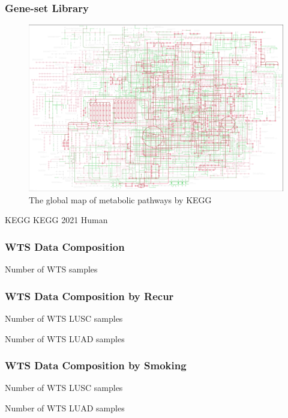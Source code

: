 \documentclass{beamer}
\begin{document}
    \begin{frame}
        \frametitle{Gene-set Library}

        \begin{figure}
            \includegraphics[width=0.6 \linewidth]{figures/Workflow/KEGG.jpg}
            \caption{The global map of metabolic pathways by KEGG \protect\cite{KEGG1}}
        \end{figure}

        \begin{block}{KEGG}
            KEGG 2021 Human
        \end{block}
    \end{frame}

    \begin{frame}
        \frametitle{WTS Data Composition}

        \begin{table}
            \caption{Number of WTS samples}
            
        \end{table}
    \end{frame}

    \begin{frame}[allowframebreaks]
        \frametitle{WTS Data Composition by Recur}

        \begin{table}
            \caption{Number of WTS LUSC samples}
            
        \end{table}

        \begin{table}
            \caption{Number of WTS LUAD samples}
            
        \end{table}
    \end{frame}

    \begin{frame}[allowframebreaks]
        \frametitle{WTS Data Composition by Smoking}

        \begin{table}
            \caption{Number of WTS LUSC samples}
            \resizebox{!}{0.3 \textheight}
            {}
        \end{table}

        \begin{table}
            \caption{Number of WTS LUAD samples}
            \resizebox{!}{0.3 \textheight}
            {}
        \end{table}
    \end{frame}
\end{document}

